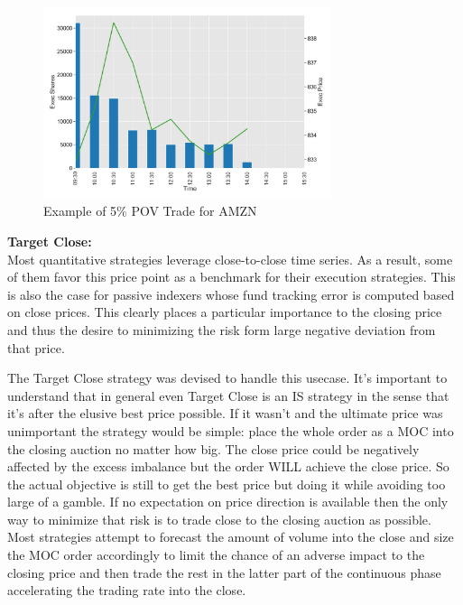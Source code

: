 	\begin{figure}[!ht]
	\centering
	\includegraphics[width=0.75\textwidth]{chapters/chapter_exec_models/figures/pov.png} 
	\caption{Example of 5\% POV Trade for AMZN \label{fig:pov}}
	\end{figure}


\noindent\textbf{Target Close:} \\

Most quantitative strategies leverage close-to-close time series. As a result, some of them favor this price point as a benchmark for their execution strategies. This is also the case for passive indexers whose fund tracking error is computed based on close prices. This clearly places a particular importance to the closing price and thus the desire to minimizing the risk form large negative deviation from that price.


The Target Close strategy was devised to handle this usecase. It's important to understand that in general even Target Close is an IS strategy in the sense that it's after the elusive best price possible. If it wasn't and the ultimate price was unimportant the strategy would be simple: place the whole order as a MOC into the closing auction no matter how big. The close price could be negatively affected by the excess imbalance but the order WILL achieve the close price. So the actual objective is still to get the best price but doing it while avoiding too large of a gamble. If no expectation on price direction is available then the only way to minimize that risk is to trade close to the closing auction as possible. Most strategies attempt to forecast the amount of volume into the close and size the MOC order accordingly to limit the chance of an adverse impact to the closing price and then trade the rest in the latter part of the continuous phase accelerating the trading rate into the close. \\

